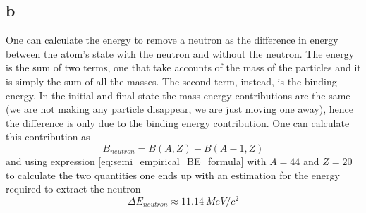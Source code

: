 \subsection*{b}
One can calculate the energy to remove a neutron as the difference in energy between the atom's state with the neutron and without the neutron. The energy is the sum of
two terms, one that take accounts of the mass of the particles and it is simply the sum of all the masses. The second term, instead, is the binding energy. In the initial and final
state the mass energy contributions are the same (we are not making any particle disappear, we are just moving one away), hence the difference is only due to the binding energy contribution. One can
calculate this contribution as
\begin{equation*}
    B_{neutron} = B(A, Z) - B(A-1, Z)
\end{equation*}
and using expression \ref{eq:semi_empirical_BE_formula} with $A=44$ and $Z=20$ to calculate the two quantities one ends up with an estimation for the energy required to extract the neutron
\begin{equation*}
    \Delta E_{neutron} \approx 11.14~MeV/c^2
\end{equation*}

